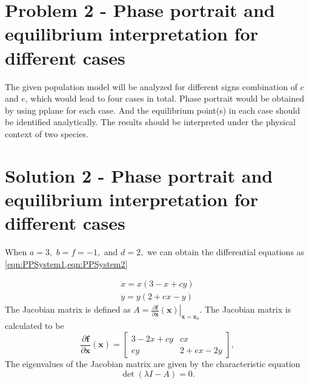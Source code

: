 \documentclass[a4paper,twocolumn]{article} %
\begin{document}
\section{Problem 2 - Phase portrait and equilibrium interpretation for different cases}
\label{sec:prob2}
The given population model will be analyzed for different signs combination of $c$ and $e$, which would lead to four cases in total. Phase portrait would be obtained by using pplane for each case. And the equilibrium point(s) in each case should be identified analytically. The results should be interpreted under the physical context of two species. 


\section{Solution 2 - Phase portrait and equilibrium interpretation for different cases}
\label{sec:solu2}
When 
$a=3,$ $b=f=-1,$ and $d=2,$
  we can obtain the differential equations as \cref{eqn:PPSystem1,eqn:PPSystem2}\par 
\begin{subequations}\label{eqn:PPSystem}
\begin{align}
    \dot{x} = x(3-x+cy) \label{eqn:PPSystem1} \\
    \dot{y} = y(2+ex-y) \label{eqn:PPSystem2}
\end{align}
\end{subequations}
The Jacobian matrix is defined as $A = \left. \frac{\partial\textbf{f}}{\partial \textbf{x}}(\textbf{x}) \right|_{\textbf{x}=\textbf{x}_0}$. The Jacobian matrix is calculated to be
\begin{equation*}
    \frac{\partial\textbf{f}}{\partial \textbf{x}}(\textbf{x}) =
    \left[\begin{array}{cc}
    3-2x+cy & cx \\
    ey & 2+ex-2y
    \end{array}\right],
\end{equation*}
The eigenvalues of the Jacobian matrix are given by the characteristic equation
\begin{equation*}
    \det(\lambda I - A) = 0.
\end{equation*}
\end{document}
